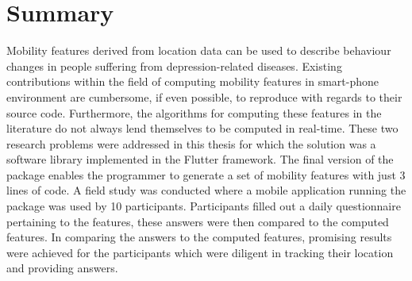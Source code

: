 \chapter{Summary}
Mobility features derived from location data can be used to describe behaviour changes in people suffering from depression-related diseases. Existing contributions within the field of computing mobility features in smart-phone environment are cumbersome, if even possible, to reproduce with regards to their source code. Furthermore, the algorithms for computing these features in the literature do not always lend themselves to be computed in real-time. These two research problems were addressed in this thesis for which the solution was a software library implemented in the Flutter framework. The final version of the package enables the programmer to generate a set of mobility features with just 3 lines of code. A field study was conducted where a mobile application running the package was used by 10 participants. Participants filled out a daily questionnaire pertaining to the features, these answers were then compared to the computed features. In comparing the answers to the computed features, promising results were achieved for the participants which were diligent in tracking their location and providing answers. 